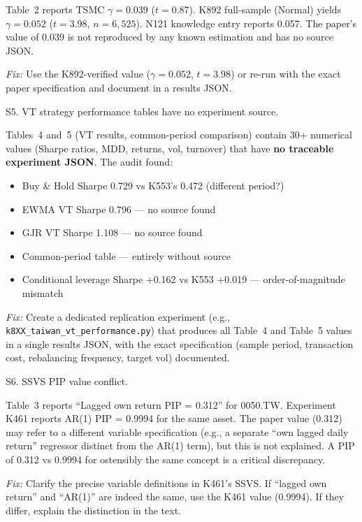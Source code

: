 \documentclass[12pt,a4paper]{article}
\begin{document}
Table~2 reports TSMC $\gamma = 0.039$ ($t = 0.87$). K892 full-sample (Normal) yields $\gamma = 0.052$ ($t = 3.98$, $n = 6{,}525$). N121 knowledge entry reports 0.057. The paper's value of 0.039 is not reproduced by any known estimation and has no source JSON.

\textit{Fix:} Use the K892-verified value ($\gamma = 0.052$, $t = 3.98$) or re-run with the exact paper specification and document in a results JSON.

\bigskip

\textcolor{errorred}{S5. VT strategy performance tables have no experiment source.}

Tables~4 and~5 (VT results, common-period comparison) contain 30+ numerical values (Sharpe ratios, MDD, returns, vol, turnover) that have \textbf{no traceable experiment JSON}. The audit found:
\begin{itemize}[nosep]
\item Buy \& Hold Sharpe 0.729 vs K553's 0.472 (different period?)
\item EWMA VT Sharpe 0.796 --- no source found
\item GJR VT Sharpe 1.108 --- no source found
\item Common-period table --- entirely without source
\item Conditional leverage Sharpe +0.162 vs K553 +0.019 --- \textcolor{errorred}{order-of-magnitude mismatch}
\end{itemize}

\textit{Fix:} Create a dedicated replication experiment (e.g., \texttt{k8XX\_taiwan\_vt\_performance.py}) that produces all Table~4 and Table~5 values in a single results JSON, with the exact specification (sample period, transaction cost, rebalancing frequency, target vol) documented.

\bigskip

\textcolor{errorred}{S6. SSVS PIP value conflict.}

Table~3 reports ``Lagged own return PIP = 0.312'' for 0050.TW. Experiment K461 reports AR(1) PIP = 0.9994 for the same asset. The paper value (0.312) may refer to a different variable specification (e.g., a separate ``own lagged daily return'' regressor distinct from the AR(1) term), but this is not explained. A PIP of 0.312 vs 0.9994 for ostensibly the same concept is a critical discrepancy.

\textit{Fix:} Clarify the precise variable definitions in K461's SSVS. If ``lagged own return'' and ``AR(1)'' are indeed the same, use the K461 value (0.9994). If they differ, explain the distinction in the text.
\end{document}
